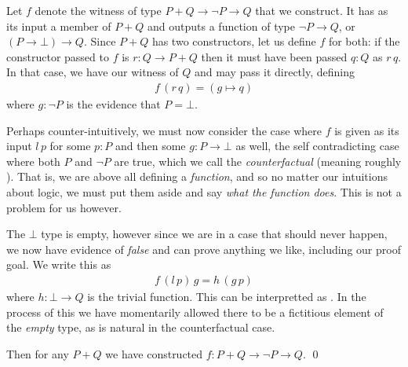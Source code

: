 \documentclass[11pt]{article}
\begin{document}
\begin{my proof}
Let $f$ denote the witness of type $P + Q \to \neg P \to Q$ that we construct. It has as its input a member of $P + Q$ and outputs a function of type $\neg P \to Q$, or $(P \to \bot) \to Q$. Since $P + Q$ has two constructors, let us define $f$ for both: if the constructor passed to $f$ is $r \colon Q \to P + Q$ then it must have been passed $q \colon Q$ as $r \hspace{2pt} q$. In that case, we have our witness of $Q$ and may pass it directly, defining \begin{gather*}
f \hspace{2pt} (r \hspace{2pt} q) = (g \mapsto q)
\end{gather*}
where $g\colon \neg P$ is the evidence that $P = \bot$.

Perhaps counter-intuitively, we must now consider the case where $f$ is given as its input $l\hspace{2pt} p$ for some $p \colon P$ and then some $g \colon P \to \bot$ as well, the self contradicting case where both $P$ and $\neg P$ are true, which we call the \emph{counterfactual} (meaning roughly ). That is, we are above all defining a \emph{function}, and so no matter our intuitions about logic, we must put them aside and say \emph{what the function does}. This is not a problem for us however.

The $\bot$ type is empty, however since we are in a case that should never happen, we now have evidence of \emph{false} and can prove anything we like, including our proof goal. We write this as \begin{gather*}
f \hspace{2pt} (l \hspace{2pt} p) \hspace{2pt} g = h \hspace{2pt} (g \hspace{2pt} p)
\end{gather*}
where $h \colon \bot \to Q$ is the trivial function. This can be interpretted as . In the process of this we have momentarily allowed there to be a fictitious element of the \emph{empty} type, as is natural in the counterfactual case.

Then for any $P + Q$ we have constructed $f \colon P + Q \to \neg P \to Q$. \qed
\end{my proof}
\end{document}
